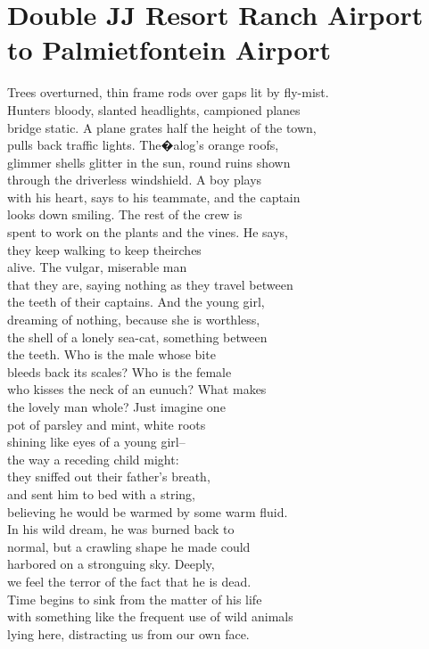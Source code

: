 \documentclass[smalldemyvopaper,11pt,twoside,onecolumn,openright,extrafontsizes]{memoir}
\begin{document}
\chapter{Double JJ Resort Ranch Airport to Palmietfontein Airport}
Trees overturned, thin frame rods over gaps lit by fly-mist.
\\Hunters bloody, slanted headlights, campioned planes
\\bridge static. A plane grates half the height of the town,
\\pulls back traffic lights. The�alog's orange roofs,
\\glimmer shells glitter in the sun, round ruins shown
\\through the driverless windshield. A boy plays
\\with his heart, says to his teammate, and the captain
\\looks down smiling. The rest of the crew is
\\spent to work on the plants and the vines. He says,
\\they keep walking to keep theirches
\\alive. The vulgar, miserable man
\\that they are, saying nothing as they travel between
\\the teeth of their captains. And the young girl,
\\dreaming of nothing, because she is worthless,
\\the shell of a lonely sea-cat, something between
\\the teeth. Who is the male whose bite
\\bleeds back its scales? Who is the female
\\who kisses the neck of an eunuch? What makes
\\the lovely man whole? Just imagine one
\\pot of parsley and mint, white roots
\\shining like eyes of a young girl--
\\the way a receding child might:
\\they sniffed out their father's breath,
\\and sent him to bed with a string,
\\believing he would be warmed by some warm fluid.
\\In his wild dream, he was burned back to
\\normal, but a crawling shape he made could
\\harbored on a stronguing sky. Deeply,
\\we feel the terror of the fact that he is dead.
\\Time begins to sink from the matter of his life
\\with something like the frequent use of wild animals
\\lying here, distracting us from our own face.
\end{document}
